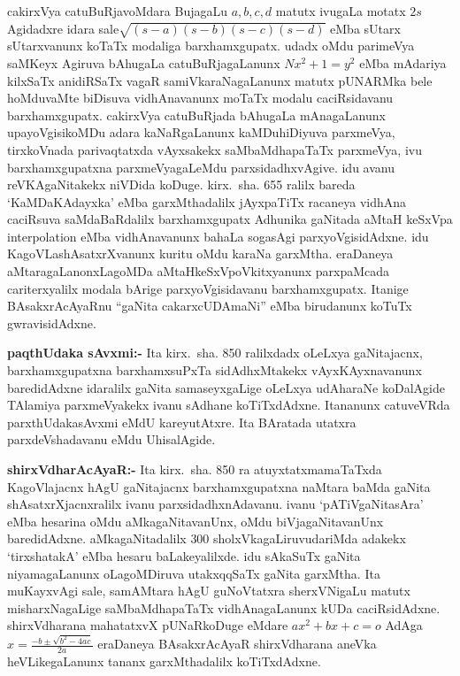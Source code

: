 cakirxVya catuBuRjavoMdara BujagaLu $a, b, c, d$ matutx ivugaLa motatx $2s$  Agidadxre idara  sale$\sqrt{(s-a)(s-b)(s-c)(s-d)}$
eMba sUtarx sUtarxvanunx koTaTx modaliga barxhamxgupatx. udadx oMdu parimeVya saMKeyx Agiruva bAhugaLa catuBuRjagaLanunx $Nx^{2}+1=y^{2}$ eMba mAdariya kilxSaTx anidiRSaTx vagaR samiVkaraNa\-gaLanunx matutx pUNARMka bele hoMduvaMte biDisuva vidhAnavanunx moTaTx modalu caciRsidavanu barxhamxgupatx. cakirxVya catuBuRjada bAhugaLa mAnagaLanunx upayoVgisikoMDu adara kaNaRgaLanunx kaMDuhiDiyuva parxmeVya, tirxkoVnada parivaqtatxda vAyxsakekx saMbaMdhapaTaTx parxmeVya, ivu barxhamxgupatxna parxmeVyagaLeMdu parxsidadhxvAgive. idu avanu reVKAgaNitakekx niVDida koDuge. kirx.~sha. {\rm 655} ralilx bareda `KaMDaKAdayxka' eMba garxMthadalilx jAyxpaTiTx racaneya vidhAna caciRsuva saMdaBaRdalilx barxhamxgupatx Adhunika gaNitada aMtaH keSxVpa {\rm interpolation} eMba vidhAnavanunx bahaLa sogasAgi parxyoVgisidAdxne. idu KagoVLashAsatxrXvanunx kuritu oMdu karaNa garxMtha. eraDaneya aMtaragaLanonxLagoMDa aMtaHkeSxVpoVkitxyanunx parxpaMcada cariterxyalilx modala bArige parxyoVgisidavanu barxhamxgupatx. Itanige BAsakxrAcAyaRnu ``gaNita cakarxcUDAmaNi'' eMba birudanunx koTuTx gwravisidAdxne. 

\textbf{paqthUdaka sAvxmi:-} Ita kirx.~sha. {\rm 850} ralilxdadx oLeLxya gaNitajacnx, barxhamxgupatxna barxhamxsuPxTa sidAdhxMtakekx vAyxKAyxnavanunx baredidAdxne idaralilx gaNita samaseyxgaLige oLeLxya udAharaNe koDalAgide TAlamiya parxmeVyakekx ivanu sAdhane koTiTxdAdxne. Itananunx catuveVRda parxthUdakasAvxmi eMdU kareyutAtxre. Ita BAratada utatxra parxdeVshadavanu eMdu UhisalAgide.

\textbf{shirxVdharAcAyaR:-} Ita kirx.~sha. {\rm 850} ra atuyxtatxmamaTaTxda KagoVlajacnx hAgU gaNitajacnx barxhamxgupatxna naMtara baMda gaNita shAsatxrXjacnxralilx ivanu parxsidadhxnAdavanu. ivanu `pATiVgaNitasAra' eMba hesarina oMdu aMkagaNitavanUnx, oMdu biVjagaNitavanUnx baredidAdxne. aMkagaNitadalilx {\rm 300} sholxVkagaLiruvudariMda adakekx `tirxshatakA' eMba hesaru baLake\-yalilxde. idu sAkaSuTx gaNita niyamagaLanunx oLagoMDiruva utakxqqSaTx gaNita garxMtha. Ita muKayxvAgi sale, samAMtara hAgU guNoVtatxra sherxVNigaLu matutx misharxNagaLige saMbaMdhapaTaTx vidhAnagaLanunx kUDa caciRsidAdxne. shirxVdharana mahatatxvX pUNaRkoDuge eMdare $ax^{2}+bx+c=o$ AdAga   $x= \frac{-b \pm \sqrt{b^{2}-4ac}}{2a}$
eraDaneya BAsakxrA\-cAyaR shirxVdharana aneVka heVLikegaLanunx tananx garxMthadalilx koTiTxdAdxne.

